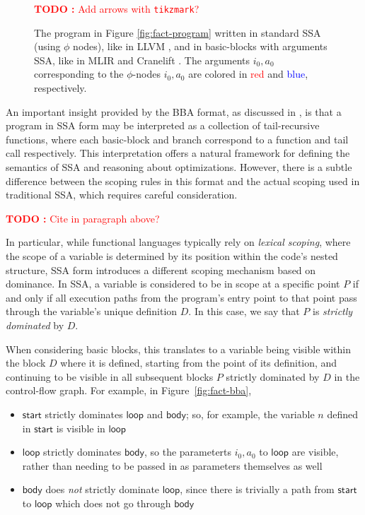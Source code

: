 \documentclass[acmsmall,screen,review]{acmart}
\newcounter{todos}
\newcommand{\TODO}[1]{{
  \stepcounter{todos}
  \begin{center}\large{\textcolor{red}{\textbf{TODO \arabic{todos}:} #1}}\end{center}
}}
\newcommand{\ms}[1]{\ensuremath{\mathsf{#1}}}
\begin{document}
\begin{figure}
  \TODO{Add arrows with \texttt{tikzmark}?}
  
  \caption{
    The program in Figure \ref{fig:fact-program} written in standard SSA (using $\phi$ nodes),
    like in LLVM \cite{llvm}, and in basic-blocks with arguments SSA, like in MLIR \cite{mlir} and
    Cranelift \cite{cranelift}. The arguments $i_0, a_0$ corresponding to the $\phi$-nodes $i_0,
    a_0$ are colored in \textcolor{red}{red} and \textcolor{blue}{blue}, respectively.
  }

  \Description{}
\end{figure}

An important insight provided by the BBA format, as discussed in \citet{appel-ssa}, is that a
program in SSA form may be interpreted as a collection of tail-recursive functions, where each
basic-block and branch correspond to a function and tail call respectively. This interpretation
offers a natural framework for defining the semantics of SSA and reasoning about optimizations.
However, there is a subtle difference between the scoping rules in this format and the actual
scoping used in traditional SSA, which requires careful consideration.

\TODO{Cite \citet{kelsey-95-cps} in paragraph above?}

In particular, while functional languages typically rely on \textit{lexical scoping}, where the
scope of a variable is determined by its position within the code's nested structure, SSA form
introduces a different scoping mechanism based on dominance. In SSA, a variable is considered to be
in scope at a specific point $P$ if and only if all execution paths from the program's entry point
to that point pass through the variable's unique definition $D$. In this case, we say that $P$ is
\textit{strictly dominated} by $D$.

When considering basic blocks, this translates to a variable being visible within the block $D$
where it is defined, starting from the point of its definition, and continuing to be visible in all
subsequent blocks $P$ strictly dominated by $D$ in the control-flow graph. For example, in
Figure~\ref{fig:fact-bba},
\begin{itemize}
  \item \ms{start} strictly dominates \ms{loop} and \ms{body}; so, for example, the variable $n$
  defined in \ms{start} is visible in \ms{loop}
  \item \ms{loop} strictly dominates \ms{body}, so the parameterts $i_0, a_0$ to \ms{loop} are
  visible, rather than needing to be passed in as parameters themselves as well
  \item \ms{body} does \textit{not} strictly dominate \ms{loop}, since there is trivially a path
  from \ms{start} to \ms{loop} which does not go through \ms{body}
\end{itemize}
\end{document}
